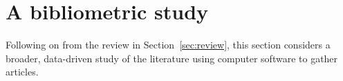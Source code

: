 \section{A bibliometric study}\label{sec:bibliometric}

Following on from the review in Section~\ref{sec:review}, this section considers
a broader, data-driven study of the literature using computer software to gather
articles.
